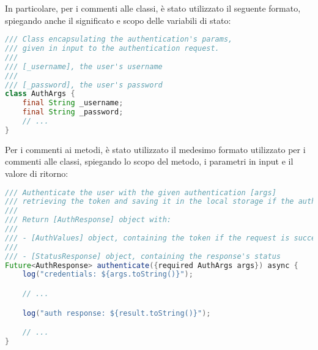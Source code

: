 In particolare, per i commenti alle classi, è stato utilizzato il seguente formato, spiegando anche il significato e scopo delle variabili di stato:
\begin{lstlisting}[language=Java, caption={Commento classe}, captionpos=b]
/// Class encapsulating the authentication's params,
/// given in input to the authentication request.
///
/// [_username], the user's username
///
/// [_password], the user's password
class AuthArgs {
    final String _username;
    final String _password;
    // ...
}
\end{lstlisting}

Per i commenti ai metodi, è stato utilizzato il medesimo formato utilizzato per i commenti alle classi, spiegando lo scopo del metodo, i parametri in input e il valore di ritorno:
\begin{lstlisting}[language=Java, caption={Commento metodo}, captionpos=b]
/// Authenticate the user with the given authentication [args]
/// retrieving the token and saving it in the local storage if the authentication request is successful.
///
/// Return [AuthResponse] object with:
///
/// - [AuthValues] object, containing the token if the request is successful
///
/// - [StatusResponse] object, containing the response's status
Future<AuthResponse> authenticate({required AuthArgs args}) async {
    log("credentials: ${args.toString()}");

    // ...

    log("auth response: ${result.toString()}");

    // ...
}
\end{lstlisting}